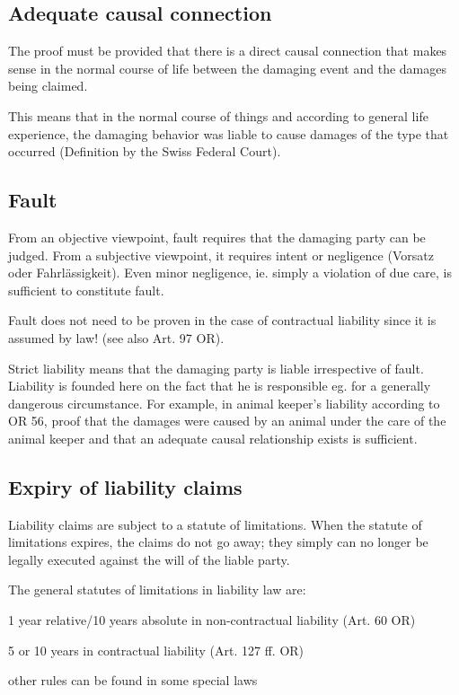 \subsection{Adequate causal connection}
\begin{compactitem}
	\item The proof must be provided that there is a direct causal connection that makes sense in the normal course of life between the damaging event and the damages being claimed.
	\item This means that in the normal course of things and according to general life experience, the damaging	behavior was liable to cause damages of the type that occurred (Definition by the Swiss Federal Court).
\end{compactitem}

\subsection{Fault}
\begin{compactitem}
	\item From an objective viewpoint, fault requires that the damaging party can be judged. From a subjective viewpoint, it requires intent or negligence (Vorsatz oder Fahrlässigkeit). Even minor negligence, ie. simply a violation of due care, is sufficient to constitute fault.
	\item Fault does not need to be proven in the case of contractual liability since it is assumed by law! (see also Art. 97 OR).
	\item Strict liability means that the damaging party is liable irrespective of fault. Liability is founded here on the fact that he is responsible eg. for a generally dangerous circumstance. For example, in animal keeper's liability according to OR 56, proof that the damages were caused by an animal under the care of the animal keeper and that an adequate causal relationship exists is sufficient.
\end{compactitem}

\subsection{Expiry of liability claims}
\begin{compactitem}
	\item Liability claims are subject to a statute of limitations. When the statute of limitations expires, the claims do not go away; they simply can no longer be legally executed against the will of the liable party.
	\item The general statutes of limitations in liability law are:
	\begin{compactitem}
		\item 1 year relative/10 years absolute in non-contractual liability (Art. 60 OR)
		\item 5 or 10 years in contractual liability (Art. 127 ff. OR)
		\item other rules can be found in some special laws
	\end{compactitem}
\end{compactitem}

